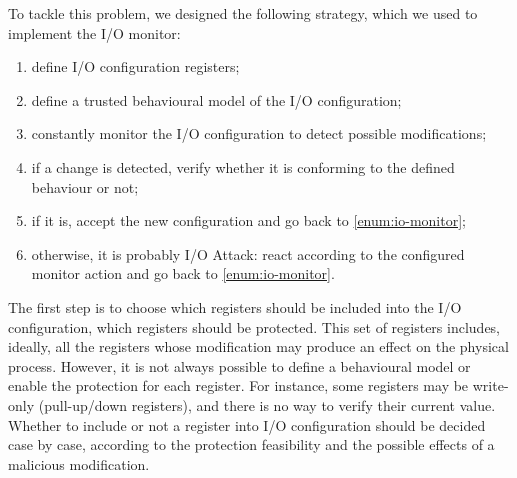 To tackle this problem, we designed the following strategy, which we used to implement the I/O monitor:
\begin{enumerate}
	\item define I/O configuration registers;
	\item define a trusted behavioural model of the I/O configuration;
	\item \label{enum:io-monitor} constantly monitor the I/O configuration to detect possible modifications;
	\item if a change is detected, verify whether it is conforming to the defined behaviour or not;
	\item if it is, accept the new configuration and go back to \ref{enum:io-monitor};
	\item otherwise, it is probably I/O Attack: react according to the configured monitor action and go back to \ref{enum:io-monitor}.
\end{enumerate}
The first step is to choose which registers should be included into the I/O configuration, \ie which registers should be protected.
This set of registers includes, ideally, all the registers whose modification may produce an effect on the physical process.
However, it is not always possible to define a behavioural model or enable the protection for each register. For instance,
some registers may be write-only (\eg pull-up/down registers), and there is no way to verify their current value.
Whether to include or not a register into I/O configuration should be decided case by case,
according to the protection feasibility and the possible effects of a malicious modification.


